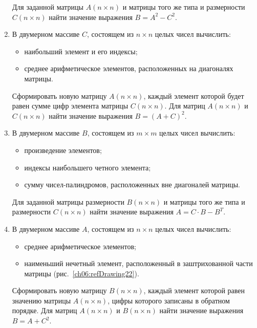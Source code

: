 \begin{enumerate}
Для заданной матрицы $A(n\times n)$ и матрицы того же типа и размерности
$C(n\times n)$ найти значение выражения  $B=A^2-C^2$.



\item В двумерном массиве $C$, состоящем из $n\times n$ целых чисел вычислить:

\begin{itemize}
\item наибольший элемент и его индексы;
\item среднее арифметическое элементов, расположенных на диагоналях матрицы.
\end{itemize}

Сформировать новую матрицу $A(n\times n)$, каждый элемент которой будет равен сумме цифр
элемента матрицы $C(n\times n)$. Для матриц $A(n\times n)$ и
$C(n\times n)$ найти значение выражения  $B=(A+C)^2$.
\item В двумерном массиве $B$, состоящем из $m\times m$ целых чисел вычислить: 
\begin{itemize}
\item произведение элементов;
\item индексы наибольшего четного элемента;
\item сумму чисел-палиндромов, расположенных вне диагоналей матрицы.
\end{itemize}

Для заданной матрицы размерности $B(n\times n)$ и матрицы того же типа и
размерности $C(n\times n)$ найти значение выражения   $A=C\cdot B-B^T$.
\item В двумерном массиве $A$, состоящем из $n\times n$ целых чисел вычислить:

\begin{itemize}
\item среднее арифметическое элементов;
\item наименьший нечетный элемент, расположенный в заштрихованной части матрицы (рис.~\ref{ch06:refDrawing22}).
\end{itemize}

Сформировать новую матрицу $B(n\times n)$, каждый элемент которой равен значению матрицы
$A(n\times n)$, цифры которого записаны в обратном порядке. Для матриц
$A(n\times n)$ и $B(n\times n)$ найти значение выражения  $B=A+C^2$.




\end{enumerate}

